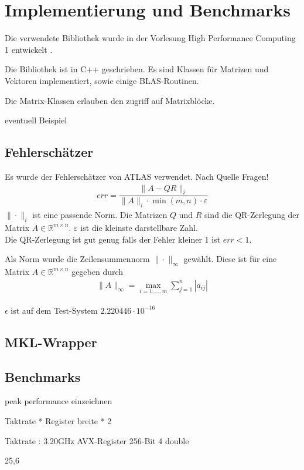 \chapter{Implementierung und Benchmarks}
Die verwendete Bibliothek wurde in der Vorlesung High Performance Computing 1 entwickelt \cite{HPC1}.

Die Bibliothek ist in C++ geschrieben. Es sind Klassen für Matrizen und Vektoren implementiert, sowie einige BLAS-Routinen.

Die Matrix-Klassen erlauben den zugriff auf Matrixblöcke. 



eventuell Beispiel

\section{Fehlerschätzer}

Es wurde der Fehlerschätzer von ATLAS verwendet. Nach Quelle Fragen!
\begin{align}
	err = \dfrac{\|A - QR\|_i}{\|A\|_i \cdot \min(m,n) \cdot \varepsilon}
\end{align}
$\|\cdot\|_i$ ist eine passende Norm.
Die Matrizen $Q$ und $R$ sind die QR-Zerlegung der Matrix $A \in \mathbb{R}^{m \times n}$.
$\varepsilon$ ist die kleinste darstellbare Zahl.\\
Die QR-Zerlegung ist gut genug falls der Fehler kleiner 1 ist $ err < 1 $.

Als Norm wurde die Zeilensummennorm $\|\cdot\|_\infty$ gewählt.
Diese ist für eine Matrix $A \in \mathbb{R}^{m\times n}$ gegeben durch
\begin{align*}
	\|A\|_\infty = \max_{i=1,...,m} \sum_{j=1}^{n} |a_{ij}|
\end{align*}

$\epsilon$ ist auf dem Test-System $2.220446\cdot10^{-16}$

\section{MKL-Wrapper}



\section{Benchmarks}

peak performance einzeichnen

Taktrate * Register breite * 2 

Taktrate : 3.20GHz  
AVX-Register 256-Bit 4 double

25,6

	 